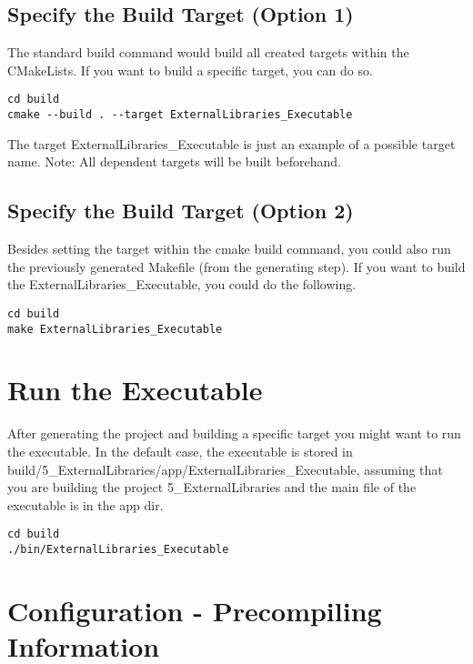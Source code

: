 \subsection{Specify the Build Target (Option 1)}

The standard build command would build all created targets within the CMakeLists.
If you want to build a specific target, you can do so.

\begin{verbatim}
cd build
cmake --build . --target ExternalLibraries_Executable
\end{verbatim}

The target ExternalLibraries\_Executable is just an example of a possible target name.
Note: All dependent targets will be built beforehand.

\subsection{Specify the Build Target (Option 2)}


Besides setting the target within the cmake build command, you could also run the previously generated Makefile (from the generating step).
If you want to build the ExternalLibraries\_Executable, you could do the following.

\begin{verbatim}
cd build
make ExternalLibraries_Executable
\end{verbatim}


\section{Run the Executable}

After generating the project and building a specific target you might want to run the executable.
In the default case, the executable is stored in build/5\_ExternalLibraries/app/ExternalLibraries\_Executable, assuming that you are building the project 5\_ExternalLibraries and the main file of the executable is in the app dir.

\begin{verbatim}
cd build
./bin/ExternalLibraries_Executable
\end{verbatim}



\section{Configuration - Precompiling Information}


